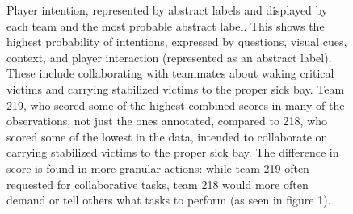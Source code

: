 \begin{figure}[h!]
    \centering
    \caption{Player intention, represented by abstract labels and displayed by each team and the most probable abstract label. This shows the highest probability of intentions, expressed by questions, visual cues, context, and player interaction (represented as an abstract label). These include collaborating with teammates about waking critical victims and carrying stabilized victims to the proper sick bay. Team 219, who scored some of the highest combined scores in many of the observations, not just the ones annotated, compared to 218, who scored some of the lowest in the data, intended to collaborate on carrying stabilized victims to the proper sick bay. The difference in score is found in more granular actions: while team 219 often requested for collaborative tasks, team 218 would more often demand or tell others what tasks to perform (as seen in figure 1).}
\end{figure}

